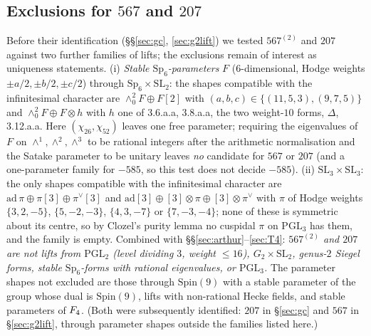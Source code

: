 \documentclass[11pt]{amsart}
\theoremstyle{definition}
\begin{document}
\subsection{Exclusions for $567$ and $207$} Before their identification (\S\S\ref{sec:gc}, \ref{sec:g2lift}) we tested $567^{(2)}$ and $207$ against two further families of lifts; the exclusions remain of interest as uniqueness statements. (i) \emph{Stable $\mathrm{Sp}_6$-parameters} $F$ ($6$-dimensional, Hodge weights $\pm a/2,\pm b/2,\pm c/2$) through $\mathrm{Sp}_6\times\mathrm{SL}_2$: the shapes compatible with the infinitesimal character are $\wedge^2_0F\oplus F[2]$ with $(a,b,c)\in\{(11,5,3),(9,7,5)\}$ and $\wedge^2_0F\oplus F\otimes h$ with $h$ one of \textsf{3.6.a.a}, \textsf{3.8.a.a}, the two weight-$10$ forms, $\Delta$, \textsf{3.12.a.a}. Here $(\chi_{26},\chi_{52})$ leaves one free parameter; requiring the eigenvalues of $F$ on $\wedge^1,\wedge^2,\wedge^3$ to be rational integers after the arithmetic normalisation and the Satake parameter to be unitary leaves \emph{no} candidate for $567$ or $207$ (and a one-parameter family for $-585$, so this test does not decide $-585$). (ii) \emph{$\mathrm{SL}_3\times\mathrm{SL}_3$}: the only shapes compatible with the infinitesimal character are $\mathrm{ad}\,\pi\oplus\pi[3]\oplus\pi^\vee[3]$ and $\mathrm{ad}[3]\oplus[3]\otimes\pi\oplus[3]\otimes\pi^\vee$ with $\pi$ of Hodge weights $\{3,2,-5\}$, $\{5,-2,-3\}$, $\{4,3,-7\}$ or $\{7,-3,-4\}$; none of these is symmetric about its centre, so by Clozel's purity lemma no cuspidal $\pi$ on $\mathrm{PGL}_3$ has them, and the family is empty. Combined with \S\S\ref{sec:arthur}--\ref{sec:T4}: \emph{$567^{(2)}$ and $207$ are not lifts from $\mathrm{PGL}_2$ (level dividing $3$, weight $\le16$), $G_2\times\mathrm{SL}_2$, genus-$2$ Siegel forms, stable $\mathrm{Sp}_6$-forms with rational eigenvalues, or $\mathrm{PGL}_3$.} The parameter shapes not excluded are those through $\mathrm{Spin}(9)$ with a stable parameter of the group whose dual is $\mathrm{Spin}(9)$, lifts with non-rational Hecke fields, and stable parameters of $F_4$. (Both were subsequently identified: $207$ in \S\ref{sec:gc} and $567$ in \S\ref{sec:g2lift}, through parameter shapes outside the families listed here.)
\end{document}

